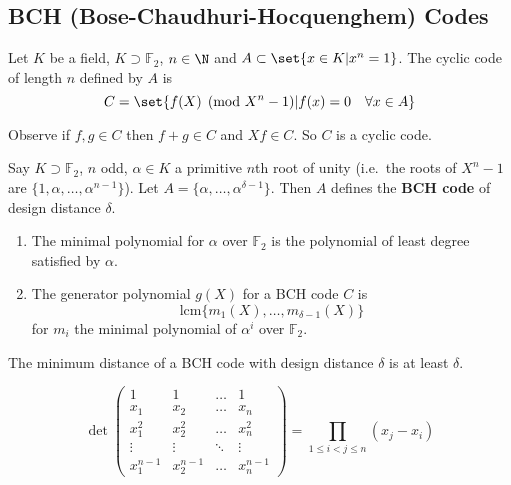\documentclass{article}
\newcommand{\F}{\mathbb{F}}
\newcommand{\1}[1]{\mathbbm{1}_{#1}}
\begin{document}
\subsection{BCH (Bose-Chaudhuri-Hocquenghem) Codes}
\begin{defi}
    Let $K$ be a field, $K \supset \F_2$, $n \in \N$ and $A \subset \set{x \in K | x^n = 1}$.
    The cyclic code of length $n$ defined by $A$ is
    \begin{equation*}
        C = \set{f(X) \pmod{X^n - 1} | f(x) = 0 \quad \forall x \in A}
    \end{equation*}
\end{defi}
Observe if $f, g \in C$ then $f + g \in C$ and $Xf \in C$. So $C$ is a cyclic code.
\begin{defi}
    Say $K \supset \F_2$, $n$ odd, $\alpha \in K$ a primitive $n$th root of unity (i.e.\ the roots of $X^n - 1$ are $\{1, \alpha, \dotsc, \alpha^{n-1}\}$).
    Let $A = \{\alpha, \dotsc, \alpha^{\delta - 1}\}$. Then $A$ defines the \textbf{BCH code} of design distance $\delta$.
\end{defi}
\begin{remark}
    \begin{enumerate}[label=(\roman*)]
        \item The minimal polynomial for $\alpha$ over $\F_2$ is the polynomial of least degree satisfied by $\alpha$.
        \item The generator polynomial $g(X)$ for a BCH code $C$ is
            \begin{equation*}
                \text{lcm} \{m_1(X), \dotsc, m_{\delta - 1}(X)\}
            \end{equation*}
            for $m_i$ the minimal polynomial of $\alpha^i$ over $\F_2$.
    \end{enumerate}
\end{remark}
\begin{nthm}\label{thm:2.33}
    The minimum distance of a BCH code with design distance $\delta$ is at least $\delta$.
\end{nthm}
\begin{lemma}
    \begin{equation*}
        \det
        \begin{pmatrix}
            1 & 1 & \dots & 1 \\
            x_1 & x_2 & \dots & x_n \\
            x_1^2 & x_2^2 & \dots & x_n^2 \\
            \vdots & \vdots & \ddots & \vdots \\
            x_1^{n-1} & x_2^{n-1} & \dots & x_n^{n-1}
        \end{pmatrix}
        = \prod_{1 \leq i < j \leq n} (x_j - x_i)
    \end{equation*}
\end{lemma}
\end{document}
